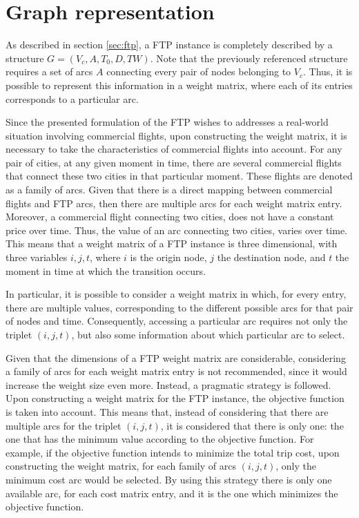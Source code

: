 \section{Graph representation}
\label{sec:ftp_graph}


As described in section \ref{sec:ftp}, a FTP instance is completely described by a structure $G =(V_c, A, T_{0}, D, TW)$. Note that the previously referenced structure requires a set of arcs $A$ connecting every pair of nodes belonging to $V_c$. Thus, it is possible to represent this information in a weight matrix, where each of its entries corresponds to a particular arc.

Since the presented formulation of the FTP wishes to addresses a real-world situation involving commercial flights, upon constructing the weight matrix, it is necessary to take the characteristics of commercial flights into account. For any pair of cities, at any given moment in time, there are several commercial flights that connect these two cities in that particular moment. These flights are denoted as a family of arcs. Given that there is a direct mapping between commercial flights and FTP arcs, then there are multiple arcs for each weight matrix entry. Moreover, a commercial flight connecting two cities, does not have a constant price over time. Thus, the value of an arc connecting two cities, varies over time. This means that a weight matrix of a FTP instance is three dimensional, with three variables $i, j, t$, where $i$ is the origin node, $j$ the destination node, and $t$ the moment in time at which the transition occurs.

In particular, it is possible to consider a weight matrix in which, for every entry, there are multiple values, corresponding to the different possible arcs for that pair of nodes and time. Consequently, accessing a particular arc requires not only the triplet $(i, j, t)$, but also some information about which particular arc to select. 

Given that the dimensions of a FTP weight matrix are considerable, considering a family of arcs for each weight matrix entry is not recommended, since it would increase the weight size even more. Instead, a pragmatic strategy is followed. Upon constructing a weight matrix for the FTP instance, the objective function is taken into account. This means that, instead of considering that there are multiple arcs for the triplet $(i, j, t)$, it is considered that there is only one: the one that has the minimum value according to the objective function. For example, if the objective function intends to minimize the total trip cost, upon constructing the weight matrix, for each family of arcs $(i, j, t)$, only the minimum cost arc would be selected. By using this strategy there is only one available arc, for each cost matrix entry, and it is the one which minimizes the objective function.

